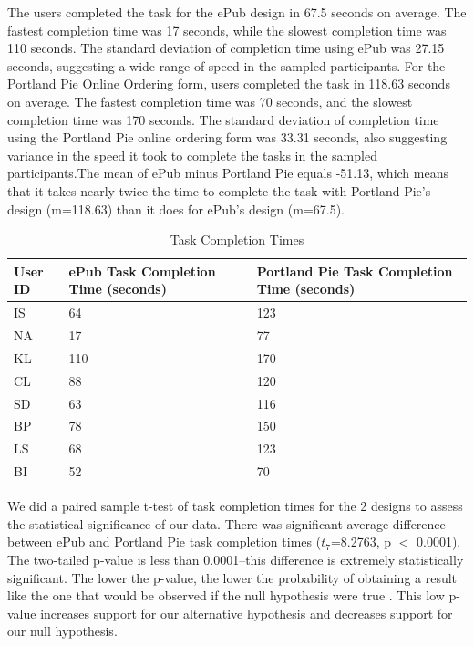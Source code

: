 \documentclass[runningheads]{llncs}
\begin{document}
The users completed the task for the ePub design in 67.5 seconds on average. The fastest completion time was 17 seconds, while the slowest completion time was 110 seconds. The standard deviation of completion time using ePub was 27.15 seconds, suggesting a wide range of speed in the sampled participants. For the Portland Pie Online Ordering form, users completed the task in 118.63 seconds on average. The fastest completion time was 70 seconds, and the slowest completion time was 170 seconds. The standard deviation of completion time using the Portland Pie online ordering form was 33.31 seconds, also suggesting variance in the speed it took to complete the tasks in the sampled participants.The mean of ePub minus Portland Pie equals -51.13, which means that it takes nearly twice the time to complete the task with Portland Pie’s design (m=118.63) than it does for ePub’s design (m=67.5). \\

\begin{table}
\centering
\renewcommand{\arraystretch}{1.2}
\renewcommand{\tabcolsep}{4mm}
\begin{tabular}{|m{1.3cm}|m{3.2cm}|m{3.9cm}|}
\hline
\textbf{User ID} &\textbf{ePub Task Completion Time (seconds)} &\textbf{Portland Pie Task Completion Time (seconds)}\\ \hline
    IS &64 &123 \\ \hline
    NA &17 &77 \\ \hline
    KL &110 &170 \\ \hline
    CL &88 &120 \\ \hline
    SD &63 &116 \\ \hline
    BP &78 &150 \\ \hline
    LS &68 &123 \\ \hline
    BI &52 &70 \\ \hline
\end{tabular}
\caption{Task Completion Times}
\vspace{-4mm}
\end{table}

We did a paired sample t-test of task completion times for the 2 designs to assess the statistical significance of our data. There was significant average difference between ePub and Portland Pie task completion times ($t_7$=8.2763, p $<$ 0.0001). The two-tailed p-value is less than 0.0001--this difference is extremely statistically significant. The lower the p-value, the lower the probability of obtaining a result like the one that would be observed if the null hypothesis were true \cite{ttest}. This low p-value increases support for our alternative hypothesis and decreases support for our null hypothesis.
\end{document}
